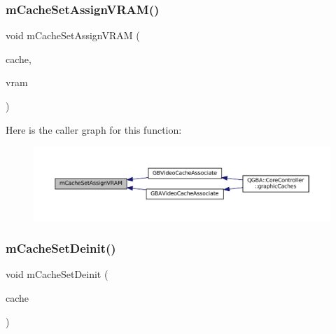 \subsubsection{\texorpdfstring{m\+Cache\+Set\+Assign\+V\+R\+A\+M()}{mCacheSetAssignVRAM()}}
{\footnotesize\ttfamily void m\+Cache\+Set\+Assign\+V\+R\+AM (\begin{DoxyParamCaption}\item[{struct m\+Cache\+Set $\ast$}]{cache,  }\item[{void $\ast$}]{vram }\end{DoxyParamCaption})}

Here is the caller graph for this function\+:
\nopagebreak
\begin{figure}[H]
\begin{center}
\leavevmode
\includegraphics[width=350pt]{core_2cache-set_8c_ac54ed5b76adf1e6bbe892e3467ca6b7a_icgraph}
\end{center}
\end{figure}
\mbox{\label{core_2cache-set_8c_ae4f1af2ec62092b9a029f684d6df8630}} 
\subsubsection{\texorpdfstring{m\+Cache\+Set\+Deinit()}{mCacheSetDeinit()}}
{\footnotesize\ttfamily void m\+Cache\+Set\+Deinit (\begin{DoxyParamCaption}\item[{struct m\+Cache\+Set $\ast$}]{cache }\end{DoxyParamCaption})}

